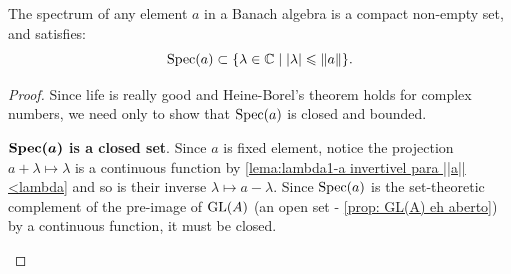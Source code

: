 \begin{teorema}
\label{teo:spec eh compacto}
The spectrum of any element $a$ in a Banach algebra is a compact non-empty set, and satisfies:
\begin{equation*}
    \operatorname{Spec}(a) \subset \{\lambda \in \operatorname{\mathbb{C}} \mid |\lambda| \leqslant \|a\|\}.
\end{equation*}
\end{teorema}
\begin{proof}
Since life is really good and Heine-Borel's theorem holds for complex numbers, we need only to show that $\operatorname{Spec}(a)$ is closed and bounded.
\begin{itroman}
\item \textbf{$\boldsymbol{\operatorname{Spec}(a)}$ is a closed set}. Since $a$ is fixed element, notice the projection ${a+\lambda}\longmapsto {\lambda}$ is a continuous function by \ref{lema:lambda1-a invertivel para ||a||<lambda} and so is their inverse $\lambda \longmapsto a-\lambda$. Since $\operatorname{Spec}(a)$ is the set-theoretic complement of the pre-image of $\operatorname{GL}(A)$ (an open set - \ref{prop: GL(A) eh aberto}) by a continuous function, it must be closed.


\end{itroman}
\end{proof}
